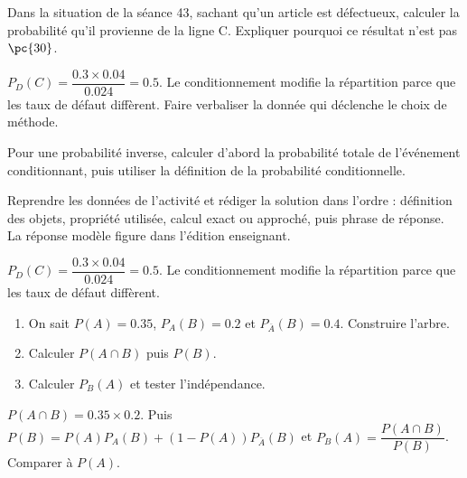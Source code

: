     \begin{activity}
    Dans la situation de la séance 43, sachant qu'un article est défectueux, calculer la probabilité qu'il provienne de la ligne C. Expliquer pourquoi ce résultat n'est pas $\pc{30}$.
    \begin{center}\end{center}
    \end{activity}
    \begin{solution}$P_D(C)=\dfrac{\num{0,3}\times\num{0,04}}{\num{0,024}}=\num{0,5}$. Le conditionnement modifie la répartition parce que les taux de défaut diffèrent. Faire verbaliser la donnée qui déclenche le choix de méthode.\end{solution}

    \begin{summary}Pour une probabilité inverse, calculer d'abord la probabilité totale de l'événement conditionnant, puis utiliser la définition de la probabilité conditionnelle.\end{summary}

    \begin{example}
    Reprendre les données de l'activité et rédiger la solution dans l'ordre : définition des objets, propriété utilisée, calcul exact ou approché, puis phrase de réponse. La réponse modèle figure dans l'édition enseignant.
    \end{example}
    \begin{solution}$P_D(C)=\dfrac{\num{0,3}\times\num{0,04}}{\num{0,024}}=\num{0,5}$. Le conditionnement modifie la répartition parce que les taux de défaut diffèrent.\end{solution}

    \begin{exercise}[essentiel]
    \begin{enumerate}\item On sait $P(A)=\num{0,35}$, $P_A(B)=\num{0,2}$ et $P_{\overline A}(B)=\num{0,4}$. Construire l'arbre.\item Calculer $P(A\cap B)$ puis $P(B)$.\item Calculer $P_B(A)$ et tester l'indépendance.\end{enumerate}
    \end{exercise}
    \begin{solution}$P(A\cap B)=\num{0,35}\times\num{0,2}$. Puis $P(B)=P(A)P_A(B)+(1-P(A))P_{\overline A}(B)$ et $P_B(A)=\dfrac{P(A\cap B)}{P(B)}$. Comparer à $P(A)$.\end{solution}

